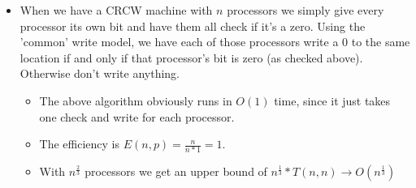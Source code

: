 \documentclass{article}
\begin{document}
\begin{itemize}
  \item When we have a CRCW machine with $n$ processors we simply give every processor its own bit and have them all check if it's a zero. Using the 'common' write model, we have each of those processors write a 0 to the same location if and only if that processor's bit is zero (as checked above). Otherwise don't write anything.
  \begin{itemize}
    \item The above algorithm obviously runs in $O(1)$ time, since it just takes one check and write for each processor.
    \item The efficiency is $E(n,p) = \frac{n}{n*1} = 1$.
    \item With $n^{\frac{2}{3}}$ processors we get an upper bound of $n^{\frac{1}{3}}*T(n,n) \rightarrow O(n^{\frac{1}{3}})$
  \end{itemize}
\end{itemize}
\end{document}
